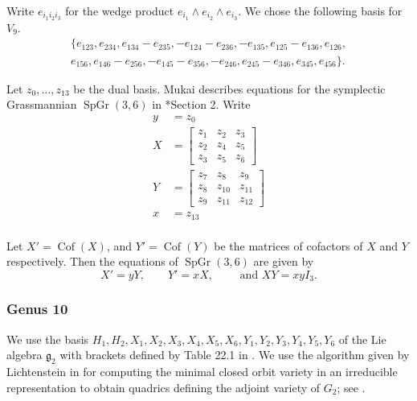\documentclass{amsart}[12pt]
\theoremstyle{definition}
\numberwithin{equation}{section}
\newcommand{\SpGr}{\operatorname{SpGr}(3,6)}
\begin{document}
Write \(e_{i_{1}i_{2}i_{3}}\) for the wedge product \(e_{i_1} \wedge
e_{i_2} \wedge e_{i_3}\). We chose the following basis for \(V_9\).
\begin{gather*}
\{ e_{123}, e_{234},e_{134}-e_{235},-e_{124}-e_{236},
-e_{135},e_{125}-e_{136}, e_{126},\\ e_{156}, e_{146}-e_{256},
-e_{145}-e_{356}, -e_{246}, e_{245}-e_{346},e_{345},e_{456}\}.
\end{gather*}

  
Let $z_0,\ldots,z_{13}$ be the dual basis. Mukai describes equations for the symplectic Grassmannian $\SpGr$ in
 \cite{Mukai2010}*{Section 2}. Write
 \begin{align*}
   y &= z_{0} \\
   X &= \left[ \begin{array}{rrr} z_1 & z_2 & z_3 \\ z_2 & z_4 & z_5 \\ z_3 & z_5 & z_6    \end{array} \right] \\
   Y &= \left[ \begin{array}{rrr} z_7 & z_8 & z_9 \\ z_8 & z_{10} & z_{11} \\ z_9 & z_{11} & z_{12}    \end{array} \right] \\
   x &= z_{13} \\
 \end{align*}

 Let $X' = \operatorname{Cof}(X)$, and $Y' = \operatorname{Cof}(Y)$ be the matrices of cofactors of $X$ and $Y$ respectively. Then the equations of $\SpGr$ are given by
 \[
  X' = yY, \qquad Y' = xX, \qquad \text{ and } XY = xy I_3.
 \]

 \subsubsection{Genus 10} We use the basis
 $H_1,H_2,X_1,X_2,X_3,X_4,X_5,X_6,Y_1,Y_2,Y_3,Y_4,Y_5,Y_6$ of the Lie
 algebra $\mathfrak{g}_2$ with brackets defined by Table 22.1 in
 \cite{FH}.  We use the algorithm given by Lichtenstein in
 \cite{Lichtenstein} for computing the minimal closed orbit variety in
 an irreducible representation to obtain quadrics defining the adjoint
 variety of $G_2$; see \cite{Code}.

 
 
\end{document}
